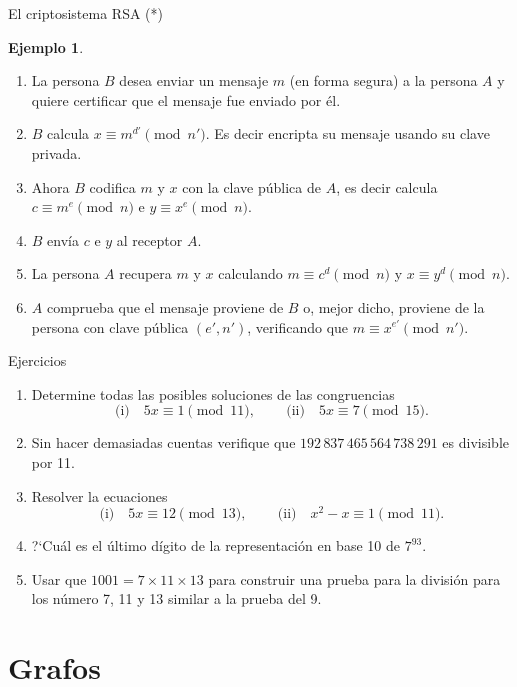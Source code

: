 \documentclass[11pt,spanish,makeidx]{amsbook}
\theoremstyle{definition}
\newtheorem{ejemplo}{Ejemplo}[section]
\theoremstyle{remark}
\begin{document}
\begin{section}{El criptosistema RSA (*)}
\begin{ejemplo}
\begin{enumerate}
\item La persona $B$ desea enviar un mensaje $m$ (en forma segura) a la persona $A$ y quiere certificar que el mensaje fue enviado por él.
\item $B$ calcula $x \equiv m^{d'} \pmod{n'}$. Es decir encripta su mensaje usando su  clave privada.
\item Ahora $B$ codifica $m$ y $x$ con la clave pública de $A$, es decir calcula $c \equiv m^{e} \pmod{n}$ e  $y \equiv x^e \pmod{n}$. 
\item $B$ envía $c$ e $y$ al receptor $A$.
\item La persona $A$ recupera $m$ y $x$ calculando  $m \equiv c^d \pmod{n}$ y  $x \equiv y^d \pmod{n}$. 
\item $A$ comprueba que el mensaje  proviene de $B$ o, mejor dicho, proviene de la persona con clave pública $(e',n')$, verificando que $m \equiv x^{e'} \pmod{n'}$. 
\end{enumerate}

\end{ejemplo}
\end{section}

\begin{section}{Ejercicios}
\begin{enumerate}
\item Determine todas las posibles soluciones de las congruencias
$$
\text{(i)}\quad 5x\equiv1 \pmod{11},\qquad\, \text{(ii)}\quad 5x\equiv 7 \pmod{15}.
$$
\item Sin hacer demasiadas cuentas verifique que $192\,837\,465\,564\,738\,291$ es divisible por 11.
\item Resolver la ecuaciones
$$
\text{(i)}\quad 5x\equiv12 \pmod{13},\qquad\, \text{(ii)}\quad x^2-x \equiv 1 \pmod{11}.
$$
\item ?`Cuál es el último dígito de la representación en base 10 de $7^{93}$.
\item Usar que $1001=7\times 11 \times 13$ para construir una prueba para la división para los número 7, 11 y 13 similar a la prueba del 9.
\end{enumerate}
\end{section}

\chapter[Grafos]{Grafos}
\end{document}
